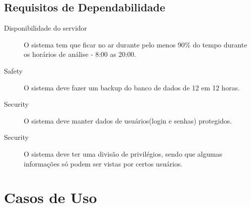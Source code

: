 \subsection{Requisitos de Dependabilidade}
\begin{description}
    \item[Disponibilidade do servidor] O sistema tem que ficar no ar
    durante pelo menos 90\% do tempo durante os horários de análise -
    8:00 as 20:00.
    \item[Safety] O sistema deve fazer um backup do banco de dados de
    12 em 12 horas.
    \item[Security] O sistema deve manter dados de usuários(login e
            senhas) protegidos.
    \item[Security] O sistema deve ter uma divisão de privilégios,
    sendo que algumas informações só podem ser vistas por certos
    usuários.
\end{description}
 


\section{Casos de Uso}

